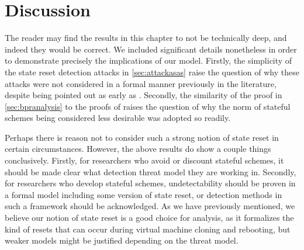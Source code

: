 \section{Discussion}

The reader may find the results in this chapter to not be technically deep, and indeed they would be correct. We included significant details nonetheless in order to demonstrate precisely the implications of our model. Firstly, the simplicity of the state reset detection attacks in \autoref{sec:attackasas} raise the question of why these attacks were not considered in a formal manner previously in the literature, despite being pointed out as early as \cite{CCS:BelJaeKan15}. Secondly, the similarity of the proof in \autoref{sec:bpranalysis} to the proofs of \cite{CCS:BelJaeKan15} raises the question of why the norm of stateful schemes being considered less desirable was adopted so readily.

Perhaps there is reason not to consider such a strong notion of state reset in certain circumstances. However, the above results do show a couple things conclusively. Firstly, for researchers who avoid or discount stateful schemes, it should be made clear what detection threat model they are working in. Secondly, for researchers who develop stateful schemes, undetectability should be proven in a formal model including some version of state reset, or detection methods in such a framework should be acknowledged. As we have previously mentioned, we believe our notion of state reset is a good choice for analysis, as it formalizes the kind of resets that can occur during virtual machine cloning and rebooting, but weaker models might be justified depending on the threat model.
